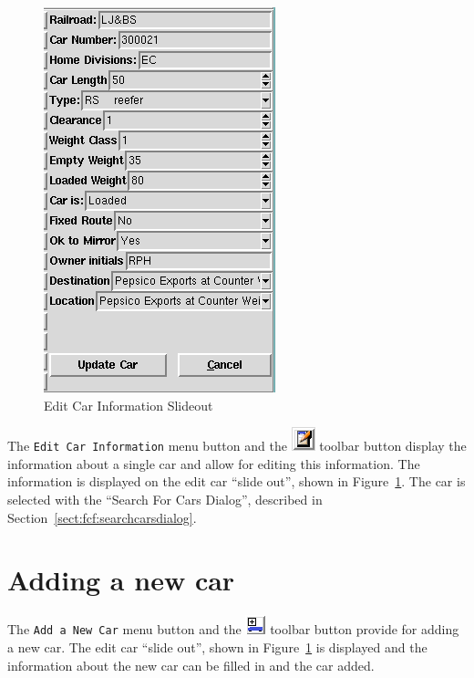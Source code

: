\begin{figure}[hbpt]
\begin{centering}
\includegraphics{FCFEditCarSlideout.png}
\caption{Edit Car Information Slideout}
\label{fig:fcf:editcarslideout}
\end{centering}
\end{figure}
The \verb=Edit Car Information= menu button and the
\includegraphics{FCFEditCarTool.png} toolbar button display the
information about a single car and allow for editing this information. 
The information is displayed on the edit car ``slide out'', shown in
Figure~\ref{fig:fcf:editcarslideout}. The car is selected with the
``Search For Cars Dialog'', described in
Section~\ref{sect:fcf:searchcarsdialog}. 

\section{Adding a new car}

The \verb=Add a New Car= menu button and the
\includegraphics{FCFAddCarTool.png} toolbar button provide for adding a
new car.  The edit car ``slide out'', shown in
Figure~\ref{fig:fcf:editcarslideout} is displayed and the information
about the new car can be filled in and the car added.

